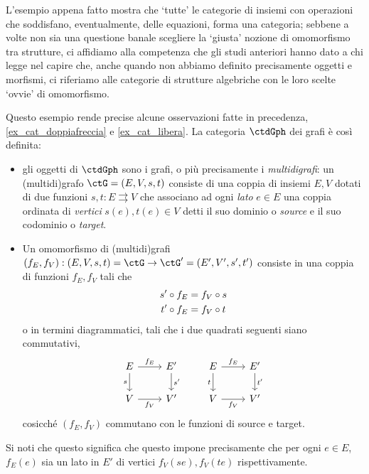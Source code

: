 \begin{notation}
	L'esempio appena fatto mostra che `tutte' le categorie di insiemi con operazioni che soddisfano, eventualmente, delle equazioni, forma una categoria; sebbene a volte non sia una questione banale scegliere la `giusta' nozione di omomorfismo tra strutture, ci affidiamo alla competenza che gli studi anteriori hanno dato a chi legge nel capire che, anche quando non abbiamo definito precisamente oggetti e morfismi, ci riferiamo alle categorie di strutture algebriche con le loro scelte `ovvie' di omomorfismo.
\end{notation}
\begin{example}\label{ex_cat_grafi}
	Questo esempio rende precise alcune osservazioni fatte in precedenza, \ref{ex_cat_doppiafreccia} e \ref{ex_cat_libera}. La categoria \(\ctdGph\) dei grafi è così definita:
	\begin{itemize}
		\item gli oggetti di \(\ctdGph\) sono i grafi, o più precisamente i \emph{multidigrafi}: un (multidi)grafo \(\ctG = (E,V,s,t)\) consiste di una coppia di insiemi \(E,V\) dotati di due funzioni \(s,t : E\rightrightarrows V\) che associano ad ogni \emph{lato} \(e\in E\) una coppia ordinata di \emph{vertici} \(s(e),t(e)\in V\) detti il suo dominio o \emph{source} e il suo codominio o \emph{target}.
		\item Un omomorfismo di (multidi)grafi \((f_E,f_V) : (E,V,s,t)=\ctG\to\ctG'= (E', V',s',t')\) consiste in una coppia di funzioni \(f_E, f_V\) tali che
		      \begin{gather*}
			      s'\circ f_E = f_V\circ s\\
			      t'\circ f_E = f_V\circ t
		      \end{gather*}
		      o in termini diagrammatici, tali che i due quadrati seguenti siano commutativi,
		      \[\begin{tikzcd}
				      E & {E'} & E & {E'} \\
				      V & {V'} & V & {V'}
				      \arrow["{f_E}", from=1-1, to=1-2]
				      \arrow["{s'}", from=1-2, to=2-2]
				      \arrow["{f_V}"', from=2-1, to=2-2]
				      \arrow["s"', from=1-1, to=2-1]
				      \arrow["{f_E}", from=1-3, to=1-4]
				      \arrow["{f_V}"', from=2-3, to=2-4]
				      \arrow["{t'}", from=1-4, to=2-4]
				      \arrow["t"', from=1-3, to=2-3]
			      \end{tikzcd}\]
		      cosicché \((f_E,f_V)\) commutano con le funzioni di source e target.
	\end{itemize}
	Si noti che questo significa che questo impone precisamente che per ogni \(e\in E\), \(f_E(e)\) sia un lato in \(E'\) di vertici \(f_V(se), f_V(te)\) rispettivamente.
\end{example}
